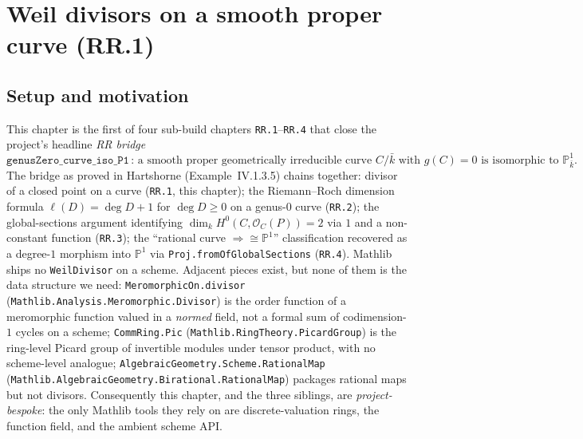 \chapter{Weil divisors on a smooth proper curve (RR.1)}
\label{chap:RiemannRoch_WeilDivisor}
\section{Setup and motivation}
This chapter is the first of four sub-build chapters \texttt{RR.1}--\texttt{RR.4}
that close the project's headline \emph{RR bridge}
\[
  \mathtt{genusZero\_curve\_iso\_P1}
  \,\colon\,
  \text{a smooth proper geometrically irreducible curve \(C / \bar k\) with
  \(g(C) = 0\) is isomorphic to \(\mathbb P^1_{\bar k}\).}
\]
The bridge as proved in Hartshorne (Example~IV.1.3.5) chains together:
divisor of a closed point on a curve (\texttt{RR.1}, this chapter); the
Riemann--Roch dimension formula \(\ell(D) = \deg D + 1\) for \(\deg D \geq 0\) on
a genus-\(0\) curve (\texttt{RR.2}); the global-sections argument identifying
\(\dim_k H^0(C, \mathcal O_C(P)) = 2\) via \(1\) and a non-constant function
(\texttt{RR.3}); the ``rational curve \(\Rightarrow \cong \mathbb P^1\)''
classification recovered as a degree-\(1\) morphism into \(\mathbb P^1\) via
\texttt{Proj.fromOfGlobalSections} (\texttt{RR.4}).
Mathlib ships no \texttt{WeilDivisor} on a scheme. Adjacent pieces exist, but
none of them is the data structure we need: \texttt{MeromorphicOn.divisor}
(\texttt{Mathlib.Analysis.Meromorphic.Divisor}) is the order function of a
meromorphic function valued in a \emph{normed} field, not a formal sum of
codimension-\(1\) cycles on a scheme; \texttt{CommRing.Pic}
(\texttt{Mathlib.RingTheory.PicardGroup}) is the ring-level Picard group of
invertible modules under tensor product, with no scheme-level analogue;
\texttt{AlgebraicGeometry.Scheme.RationalMap}
(\texttt{Mathlib.AlgebraicGeometry.Birational.RationalMap}) packages rational
maps but not divisors. Consequently this chapter, and the three siblings, are
\emph{project-bespoke}: the only Mathlib tools they rely on are
discrete-valuation rings, the function field, and the ambient scheme API.
